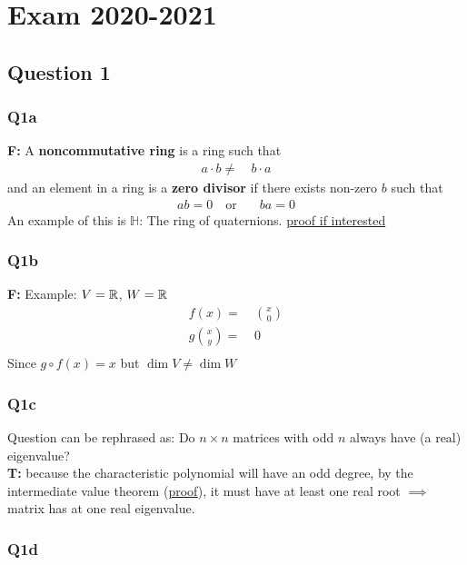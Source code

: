\section{Exam 2020-2021}

\subsection{Question 1}
\subsubsection{Q1a}
\textbf{F:} A \textbf{noncommutative ring} is a ring such that
\begin{align*}
	a\cdot b \neq & \ b\cdot a
\end{align*}
and an element in a ring is a \textbf{zero divisor} if there exists non-zero $b$ such that
\begin{align*}
	ab=0 \quad \text{or} & \quad ba=0
\end{align*}
An example of this is $\mathbb{H}$: The ring of quaternions. \href{https://mathsci2.appstate.edu/~sjg/class/3110/mathfestalg2000/quaternions.html#:~:text=abelian\%20under\%20multiplication.-,Quaternions\%20are\%20Not\%20an\%20Integral,but\%20have\%20no\%20zero\%2Ddivisors.}{proof if interested}
\subsubsection{Q1b}
\textbf{F:} Example: $V=\mathbb{R}$, $W=\mathbb{R}$
\begin{align*}
	f(x)=          & \ \binom{x}{0} \\
	g\binom{x}{y}= & \ 0            \\
\end{align*}
Since $g\circ f(x)=x$ but $\dim{V}\neq\dim{W}$


\subsubsection{Q1c}
Question can be rephrased as: Do $n\times n$ matrices with odd $n$ always have (a real) eigenvalue?\\
\noindent\textbf{T:} because the characteristic polynomial will have an odd degree, by the intermediate value theorem (\href{https://math.stackexchange.com/questions/689575/proof-that-every-polynomial-of-odd-degree-has-one-real-root}{proof}), it must have at least one real root $\implies$ matrix has at one real eigenvalue.
\subsubsection{Q1d}

